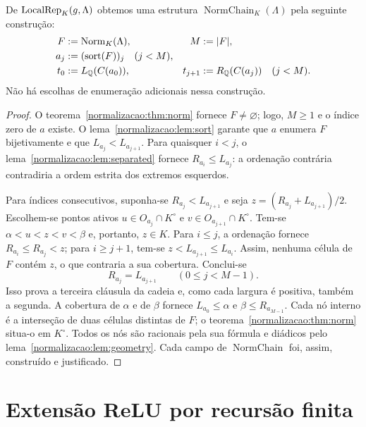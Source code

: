 \begin{teorema}\label{map:normalizacao:7.4}\label{normalizacao:thm:chain}
De $\operatorname{LocalRep}_K(g,\Lambda)$ obtemos uma estrutura
$\operatorname{NormChain}_K(\Lambda)$ pela seguinte construção:
\begin{align*}
 F&:=\operatorname{Norm}_K(\Lambda),& M&:=|F|,\\
 a_j&:=(\operatorname{sort}(F))_j\quad(j<M),\\
 t_0&:=L_\mathbb Q(C(a_0)),&
 t_{j+1}&:=R_\mathbb Q(C(a_j))\quad(j<M).
\end{align*}
Não há escolhas de enumeração adicionais nessa construção.
\end{teorema}
\begin{proof}
O teorema~\ref{normalizacao:thm:norm} fornece $F\ne\varnothing$; logo, $M\ge1$
e o índice zero de $a$ existe. O lema~\ref{normalizacao:lem:sort} garante
que $a$ enumera $F$ bijetivamente e que $L_{a_j}<L_{a_{j+1}}$.
Para quaisquer $i<j$, o lema~\ref{normalizacao:lem:separated} fornece
$R_{a_i}\le L_{a_j}$: a ordenação contrária contradiria a ordem
estrita dos extremos esquerdos.

Para índices consecutivos, suponha-se
$R_{a_j}<L_{a_{j+1}}$ e seja
$z=(R_{a_j}+L_{a_{j+1}})/2$. Escolhem-se pontos ativos
$u\in O_{a_j}\cap K^\circ$ e
$v\in O_{a_{j+1}}\cap K^\circ$. Tem-se
$\alpha<u<z<v<\beta$ e, portanto, $z\in K$.
Para $i\le j$, a ordenação fornece $R_{a_i}\le R_{a_j}<z$;
para $i\ge j+1$, tem-se $z<L_{a_{j+1}}\le L_{a_i}$.
Assim, nenhuma célula de $F$ contém $z$, o que contraria a sua cobertura.
Conclui-se
\[
 R_{a_j}=L_{a_{j+1}}\qquad(0\le j<M-1).
\]
Isso prova a terceira cláusula da cadeia e, como cada largura é
positiva, também a segunda. A cobertura de $\alpha$ e de $\beta$
fornece $L_{a_0}\le\alpha$ e $\beta\le R_{a_{M-1}}$.
Cada nó interno é a interseção de duas células distintas de $F$;
o teorema~\ref{normalizacao:thm:norm} situa-o em $K^\circ$.
Todos os nós são racionais pela sua fórmula e diádicos pelo
lema~\ref{normalizacao:lem:geometry}. Cada campo de
$\operatorname{NormChain}$ foi, assim, construído e justificado.
\end{proof}

\section{Extensão ReLU por recursão finita}
\label{normalizacao:sec:relu}

